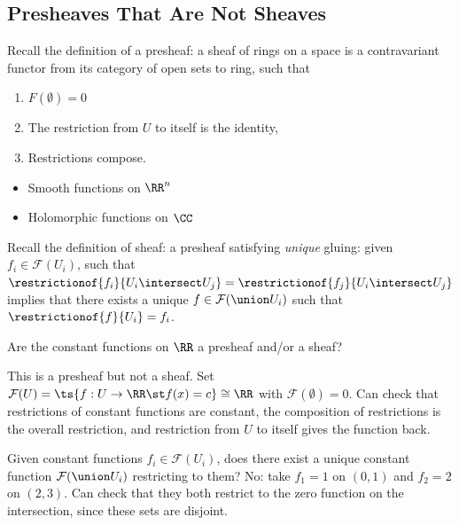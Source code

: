 \hypertarget{presheaves-that-are-not-sheaves}{%
\subsection{Presheaves That Are Not
Sheaves}\label{presheaves-that-are-not-sheaves}}

Recall the definition of a presheaf: a sheaf of rings on a space is a
contravariant functor from its category of open sets to ring, such that

\begin{enumerate}
\def\labelenumi{\arabic{enumi}.}
\tightlist
\item
  \(F(\emptyset) = 0\)
\item
  The restriction from \(U\) to itself is the identity,
\item
  Restrictions compose.
\end{enumerate}

\begin{example}[?]

\envlist

\begin{itemize}
\tightlist
\item
  Smooth functions on \(\RR^n\)
\item
  Holomorphic functions on \(\CC\)
\end{itemize}

\end{example}

Recall the definition of sheaf: a presheaf satisfying \emph{unique}
gluing: given \(f_i \in \mathcal{F}(U_i)\), such that
\(\restrictionof{f_i}{U_i \intersect U_j} = \restrictionof{f_j}{U_i\intersect U_j}\)
implies that there exists a unique \(f\in \mathcal{F}(\union U_i)\) such
that \(\restrictionof{f}{U_i} = f_i\).

\begin{question}

Are the constant functions on \(\RR\) a presheaf and/or a sheaf?

\end{question}

\begin{answer}

This is a presheaf but not a sheaf. Set
\(\mathcal{F}(U) = \ts{f: U\to \RR \st f(x) = c} \cong \RR\) with
\(\mathcal{F}(\emptyset) = 0\). Can check that restrictions of constant
functions are constant, the composition of restrictions is the overall
restriction, and restriction from \(U\) to itself gives the function
back.

Given constant functions \(f_i \in \mathcal{F}(U_i)\), does there exist
a unique constant function \(\mathcal{F}(\union U_i)\) restricting to
them? No: take \(f_1 = 1\) on \((0, 1)\) and \(f_2 = 2\) on \((2, 3)\).
Can check that they both restrict to the zero function on the
intersection, since these sets are disjoint.

\end{answer}

